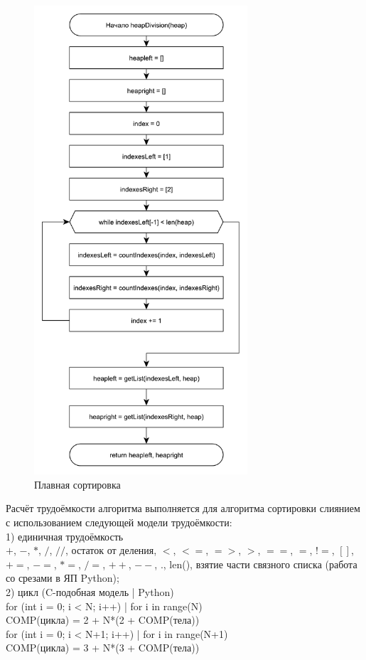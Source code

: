 \documentclass[12pt,a4paper]{scrartcl}
\begin{document}
\begin{figure}[h!]
	\centering
	\includegraphics[width=300px]{35.pdf}
	\caption{Плавная сортировка}
	\label{graph2.9}
\end{figure}

Расчёт трудоёмкости алгоритма выполняется для алгоритма сортировки слиянием с использованием следующей модели трудоёмкости:\\
1) единичная трудоёмкость\\
$+$, $-$, $*$, $/$, $//$, остаток от деления, $<$, $<=$, $=>$, $>$, $==$, $=$, $!=$, $[]$, $+=$, $-=$, $*=$, $/=$, $++$, $--$, $.$, len(), взятие части связного списка (работа со срезами в ЯП Python); \\
2) цикл (C-подобная модель | Python) \\
for (int i = 0; i < N; i++) | for i in range(N) \\
COMP(цикла) = 2 + N*(2 + COMP(тела)) \\
for (int i = 0; i < N+1; i++) | for i in range(N+1) \\
COMP(цикла) = 3 + N*(3 + COMP(тела)) 
\end{document}
